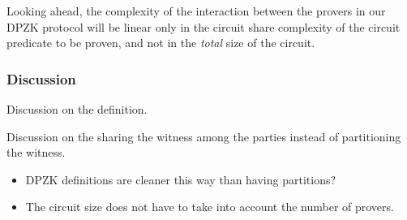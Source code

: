 Looking ahead, the complexity of the interaction between the provers in our DPZK protocol will be linear only in the circuit share complexity of the circuit predicate to be proven, and not in the \textit{total} size of the circuit. 
 
\subsubsection{Discussion}
Discussion on the definition.

Discussion on the sharing the witness among the parties instead of partitioning the witness.
\begin{itemize}
\item DPZK definitions are cleaner this way than having partitions?
\item The circuit size does not have to take into account the number of provers.
\end{itemize}

%
%
